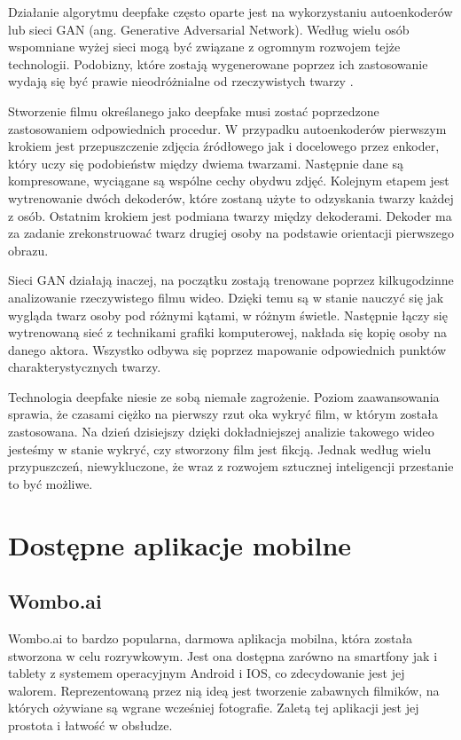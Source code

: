 Działanie algorytmu deepfake często oparte jest na wykorzystaniu autoenkoderów lub sieci GAN (ang. Generative Adversarial Network). Według wielu osób wspomniane wyżej sieci mogą być związane z ogromnym rozwojem tejże technologii. Podobizny, które zostają wygenerowane poprzez ich zastosowanie wydają się być prawie nieodróżnialne od rzeczywistych twarzy \cite{deepfake}.

Stworzenie filmu określanego jako deepfake musi zostać poprzedzone zastosowaniem odpowiednich procedur. W przypadku autoenkoderów pierwszym krokiem jest przepuszczenie zdjęcia źródłowego jak i docelowego przez enkoder, który uczy się podobieństw między dwiema twarzami. Następnie dane są kompresowane, wyciągane są wspólne cechy obydwu zdjęć. Kolejnym etapem jest wytrenowanie dwóch dekoderów, które zostaną użyte to odzyskania twarzy każdej z osób. Ostatnim krokiem jest podmiana twarzy między dekoderami. Dekoder ma za zadanie zrekonstruować twarz drugiej osoby na podstawie orientacji pierwszego obrazu. 

Sieci GAN działają inaczej, na początku zostają trenowane poprzez kilkugodzinne analizowanie rzeczywistego filmu wideo. Dzięki temu są w stanie nauczyć się jak wygląda twarz osoby pod różnymi kątami, w różnym świetle. Następnie łączy się wytrenowaną sieć z technikami grafiki komputerowej, nakłada się kopię osoby na danego aktora. Wszystko odbywa się poprzez mapowanie odpowiednich punktów charakterystycznych twarzy.

Technologia deepfake niesie ze sobą niemałe zagrożenie. Poziom zaawansowania sprawia, że czasami ciężko na pierwszy rzut oka wykryć film, w którym została zastosowana. Na dzień dzisiejszy dzięki dokładniejszej analizie takowego wideo jesteśmy w stanie wykryć, czy stworzony film jest fikcją. Jednak według wielu przypuszczeń, niewykluczone, że wraz z rozwojem sztucznej inteligencji przestanie to być możliwe.


\section{Dostępne aplikacje mobilne}

\subsection{Wombo.ai}
Wombo.ai \cite{womboai} to bardzo popularna, darmowa aplikacja mobilna, która została stworzona w celu rozrywkowym. Jest ona dostępna zarówno na smartfony jak i tablety z systemem operacyjnym Android i IOS, co zdecydowanie jest jej walorem. Reprezentowaną przez nią ideą jest tworzenie zabawnych filmików, na których ożywiane są wgrane wcześniej fotografie. Zaletą tej aplikacji jest jej prostota i łatwość w obsłudze. 

